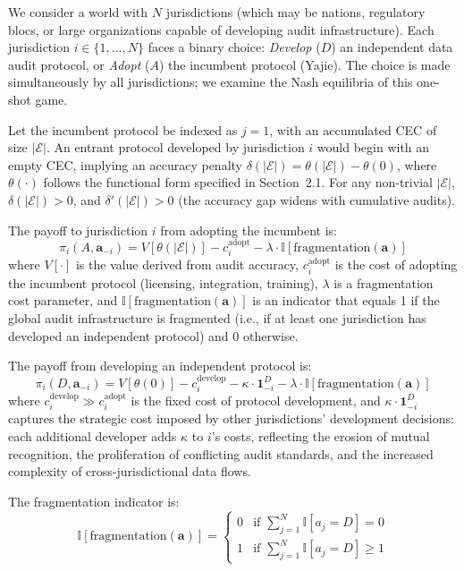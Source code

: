 \documentclass[12pt,a4paper]{article}
\theoremstyle{definition}
\theoremstyle{remark}
\begin{document}
We consider a world with $N$ jurisdictions (which may be nations, regulatory blocs, or large organizations capable of developing audit infrastructure). Each jurisdiction $i \in \{1, \ldots, N\}$ faces a binary choice: \textit{Develop} ($D$) an independent data audit protocol, or \textit{Adopt} ($A$) the incumbent protocol (Yajie). The choice is made simultaneously by all jurisdictions; we examine the Nash equilibria of this one-shot game.

Let the incumbent protocol be indexed as $j=1$, with an accumulated CEC of size $|\mathcal{E}|$. An entrant protocol developed by jurisdiction $i$ would begin with an empty CEC, implying an accuracy penalty $\delta(|\mathcal{E}|) = \theta(|\mathcal{E}|) - \theta(0)$, where $\theta(\cdot)$ follows the functional form specified in Section~2.1. For any non-trivial $|\mathcal{E}|$, $\delta(|\mathcal{E}|) > 0$, and $\delta'(|\mathcal{E}|) > 0$ (the accuracy gap widens with cumulative audits).

The payoff to jurisdiction $i$ from adopting the incumbent is:
\begin{equation}
\pi_i(A, \mathbf{a}_{-i}) = V[\theta(|\mathcal{E}|)] - c_i^{\text{adopt}} - \lambda \cdot \mathbb{I}[\text{fragmentation}(\mathbf{a})]
\end{equation}
where $V[\cdot]$ is the value derived from audit accuracy, $c_i^{\text{adopt}}$ is the cost of adopting the incumbent protocol (licensing, integration, training), $\lambda$ is a fragmentation cost parameter, and $\mathbb{I}[\text{fragmentation}(\mathbf{a})]$ is an indicator that equals 1 if the global audit infrastructure is fragmented (i.e., if at least one jurisdiction has developed an independent protocol) and 0 otherwise.

The payoff from developing an independent protocol is:
\begin{equation}
\pi_i(D, \mathbf{a}_{-i}) = V[\theta(0)] - c_i^{\text{develop}} - \kappa \cdot \mathbf{1}_{-i}^D - \lambda \cdot \mathbb{I}[\text{fragmentation}(\mathbf{a})]
\end{equation}
where $c_i^{\text{develop}} \gg c_i^{\text{adopt}}$ is the fixed cost of protocol development, and $\kappa \cdot \mathbf{1}_{-i}^D$ captures the strategic cost imposed by other jurisdictions' development decisions: each additional developer adds $\kappa$ to $i$'s costs, reflecting the erosion of mutual recognition, the proliferation of conflicting audit standards, and the increased complexity of cross-jurisdictional data flows.

The fragmentation indicator is:
\begin{equation}
\mathbb{I}[\text{fragmentation}(\mathbf{a})] = \begin{cases} 0 & \text{if } \sum_{j=1}^N \mathbb{I}[a_j = D] = 0 \\ 1 & \text{if } \sum_{j=1}^N \mathbb{I}[a_j = D] \geq 1 \end{cases}
\end{equation}
\end{document}
